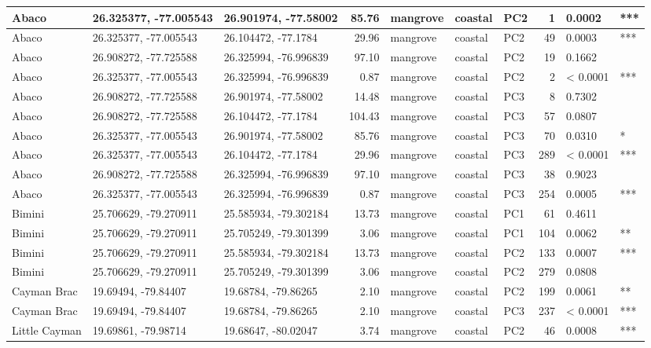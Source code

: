 \begin{tabular}{l|l|l|r|l|l|l|r|l|l}
\hline
Abaco & 26.325377, -77.005543 & 26.901974, -77.58002 & 85.76 & mangrove & coastal & PC2 & 1 & 0.0002 & ***\\
\hline
Abaco & 26.325377, -77.005543 & 26.104472, -77.1784 & 29.96 & mangrove & coastal & PC2 & 49 & 0.0003 & ***\\
\hline
Abaco & 26.908272, -77.725588 & 26.325994, -76.996839 & 97.10 & mangrove & coastal & PC2 & 19 & 0.1662 & \\
\hline
Abaco & 26.325377, -77.005543 & 26.325994, -76.996839 & 0.87 & mangrove & coastal & PC2 & 2 & < 0.0001 & ***\\
\hline
Abaco & 26.908272, -77.725588 & 26.901974, -77.58002 & 14.48 & mangrove & coastal & PC3 & 8 & 0.7302 & \\
\hline
Abaco & 26.908272, -77.725588 & 26.104472, -77.1784 & 104.43 & mangrove & coastal & PC3 & 57 & 0.0807 & \\
\hline
Abaco & 26.325377, -77.005543 & 26.901974, -77.58002 & 85.76 & mangrove & coastal & PC3 & 70 & 0.0310 & *\\
\hline
Abaco & 26.325377, -77.005543 & 26.104472, -77.1784 & 29.96 & mangrove & coastal & PC3 & 289 & < 0.0001 & ***\\
\hline
Abaco & 26.908272, -77.725588 & 26.325994, -76.996839 & 97.10 & mangrove & coastal & PC3 & 38 & 0.9023 & \\
\hline
Abaco & 26.325377, -77.005543 & 26.325994, -76.996839 & 0.87 & mangrove & coastal & PC3 & 254 & 0.0005 & ***\\
\hline
Bimini & 25.706629, -79.270911 & 25.585934, -79.302184 & 13.73 & mangrove & coastal & PC1 & 61 & 0.4611 & \\
\hline
Bimini & 25.706629, -79.270911 & 25.705249, -79.301399 & 3.06 & mangrove & coastal & PC1 & 104 & 0.0062 & **\\
\hline
Bimini & 25.706629, -79.270911 & 25.585934, -79.302184 & 13.73 & mangrove & coastal & PC2 & 133 & 0.0007 & ***\\
\hline
Bimini & 25.706629, -79.270911 & 25.705249, -79.301399 & 3.06 & mangrove & coastal & PC2 & 279 & 0.0808 & \\
\hline
Cayman Brac & 19.69494, -79.84407 & 19.68784, -79.86265 & 2.10 & mangrove & coastal & PC2 & 199 & 0.0061 & **\\
\hline
Cayman Brac & 19.69494, -79.84407 & 19.68784, -79.86265 & 2.10 & mangrove & coastal & PC3 & 237 & < 0.0001 & ***\\
\hline
Little Cayman & 19.69861, -79.98714 & 19.68647, -80.02047 & 3.74 & mangrove & coastal & PC2 & 46 & 0.0008 & ***\\

\end{tabular}
